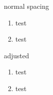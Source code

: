 \documentclass{beamer}
\begin{document}
    \begin{frame}
        normal spacing
        \begin{enumerate}
            \item test
            \item test
        \end{enumerate}

        adjusted

        \setlength{\leftmargini}{0.5cm}
        \begin{enumerate}
            \item test
            \item test
        \end{enumerate}

\end{frame} 
\end{document}
